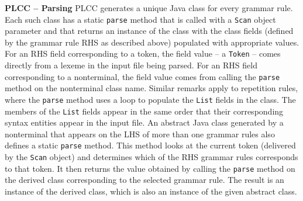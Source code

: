 \begin{minipage}[t]{\sw}
\slidenumber
\LARGE
{\bf PLCC -- Parsing}\exx
PLCC generates a unique Java class for every grammar rule.
Each such class has a static \verb'parse' method
that is called with a \verb'Scan' object parameter
and that returns an instance of the class
with the class fields (defined by the grammar rule RHS as described above)
populated with appropriate values.
For an RHS field corresponding to a token,
the field value -- a \verb'Token' -- comes directly
from a lexeme in the input file being parsed.
For an RHS field corresponding to a nonterminal,
the field value comes from calling the \verb'parse' method
on the nonterminal class name.\exx
Similar remarks apply to repetition rules,
where the \verb'parse' method uses a loop
to populate the \verb'List' fields in the class.
The members of the \verb'List' fields appear
in the same order that their corresponding syntax entities
appear in the input file.\exx
An abstract Java class generated by a nonterminal
that appears on the LHS of more than one grammar rules
also defines a static \verb'parse' method.
This method looks at the current token (delivered by the \verb'Scan' object)
and determines which of the RHS grammar rules corresponds to that token.
It then returns the value obtained
by calling the \verb'parse' method on the derived class
corresponding to the selected grammar rule.
The result is an instance of the derived class,
which is also an instance of the given abstract class.
\end{minipage}
\clearpage
